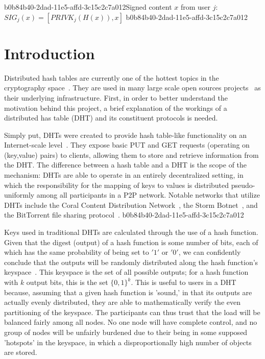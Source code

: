 \documentclass[12pt]{article}
\begin{document}
b0b84b40-2dad-11e5-affd-3c15c2c7a012Signed content $x$ from user $j$: $SIG_j(x) = \left[ PRIVK_j( H(x) ), x \right]$
b0b84b40-2dad-11e5-affd-3c15c2c7a012
\section{Introduction}
\par Distributed hash tables are currently one of the hottest topics in the cryptography space~\cite{Stoica:2001dj,Rowstron:2001ea,Ratnasamy:2001wn}. They are used in many large scale open sources projects~\cite{Freitas:2013tb,Xu:2010vs,Perfitt:2010fh} as their underlying infrastructure. First, in order to better understand the motivation behind this project, a brief explanation of the workings of a distributed has table (DHT) and its constituent protocols is needed.

\par Simply put, DHTs were created to provide hash table-like functionality on an Internet-scale level~\cite{Ratnasamy:2001wn}. They expose basic PUT and GET requests (operating on (key,value) pairs) to clients, allowing them to store and retrieve information from the DHT. The difference between a hash table and a DHT is the scope of the mechanism: DHTs are able to operate in an entirely decentralized setting, in which the responsibility for the mapping of keys to values is distributed pseudo-uniformly among all participants in a P2P network. Notable networks that utilize DHTs include the Coral Content Distribution Network~\cite{Freedman:2004vb}, the Storm Botnet~\cite{Holz:2008uk}, and the BitTorrent file sharing protocol~\cite{Cohen:y1_8mBnw}.
b0b84b40-2dad-11e5-affd-3c15c2c7a012
\par Keys used in traditional DHTs are calculated through the use of a hash function. Given that the digest (output) of a hash function is some number of bits, each of which has the same probability of being set to $'1'$ or $'0'$, we can confidently conclude that the outputs will be randomly distributed along the hash function's keyspace~. This keyspace is the set of all possible outputs; for a hash function with $k$ output bits, this is the set $\{0,1\}^k$. This is useful to users in a DHT because, assuming that a given hash function is 'sound,' in that its outputs are actually evenly distributed, they are able to mathematically verify the even partitioning of the keyspace. The participants can thus trust that the load will be balanced fairly among all nodes. No one node will have complete control, and no group of nodes will be unfairly burdened due to their being in some supposed 'hotspots' in the keyspace, in which a disproportionally high number of objects are stored.~
\end{document}
